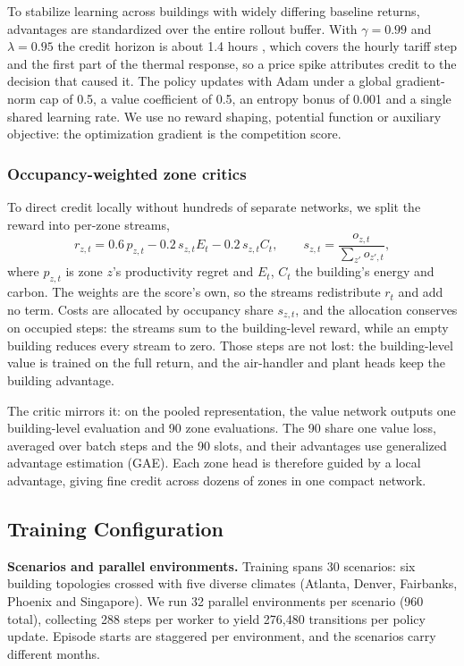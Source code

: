 \documentclass{article}
\begin{document}
To stabilize learning across buildings with widely differing baseline returns, advantages are standardized over the entire rollout buffer. With $\gamma = 0.99$ and $\lambda = 0.95$ the credit horizon is about 1.4 hours \citep{schulman2016gae}, which covers the hourly tariff step and the first part of the thermal response, so a price spike attributes credit to the decision that caused it. The policy updates with Adam under a global gradient-norm cap of 0.5, a value coefficient of 0.5, an entropy bonus of 0.001 and a single shared learning rate. We use no reward shaping, potential function or auxiliary objective: the optimization gradient is the competition score.

\subsubsection{Occupancy-weighted zone critics}

To direct credit locally without hundreds of separate networks, we split the reward into per-zone streams,
\[
r_{z,t} = 0.6\,p_{z,t} - 0.2\,s_{z,t}E_t - 0.2\,s_{z,t}C_t, \qquad s_{z,t} = \frac{o_{z,t}}{\sum_{z'} o_{z',t}},
\]
where $p_{z,t}$ is zone $z$'s productivity regret and $E_t$, $C_t$ the building's energy and carbon. The weights are the score's own, so the streams redistribute $r_t$ and add no term. Costs are allocated by occupancy share $s_{z,t}$, and the allocation conserves on occupied steps: the streams sum to the building-level reward, while an empty building reduces every stream to zero. Those steps are not lost: the building-level value is trained on the full return, and the air-handler and plant heads keep the building advantage.

The critic mirrors it: on the pooled representation, the value network outputs one building-level evaluation and 90 zone evaluations. The 90 share one value loss, averaged over batch steps and the 90 slots, and their advantages use generalized advantage estimation (GAE). Each zone head is therefore guided by a local advantage, giving fine credit across dozens of zones in one compact network.

\subsection{Training Configuration}

\textbf{Scenarios and parallel environments.} Training spans 30 scenarios: six building topologies crossed with five diverse climates (Atlanta, Denver, Fairbanks, Phoenix and Singapore). We run 32 parallel environments per scenario (960 total), collecting 288 steps per worker to yield 276,480 transitions per policy update. Episode starts are staggered per environment, and the scenarios carry different months.
\end{document}
